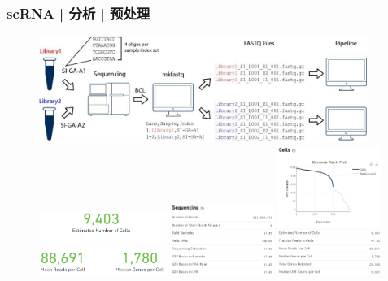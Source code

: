\documentclass[11pt]{ctexbeamer}
\begin{document}
\begin{frame}
  \frametitle{scRNA | 分析 | 预处理}
   \begin{figure}
    \centering
    \includegraphics[width=0.95\textwidth]{scRNA_cellranger_01.png}\\ \vspace{0.3em}
    \includegraphics[width=0.37\textwidth]{scRNA_cellranger_02.png}
    \includegraphics[width=0.3\textwidth]{scRNA_cellranger_03.png}
    \includegraphics[width=0.3\textwidth]{scRNA_cellranger_04.png}
  \end{figure}
\end{frame}
\end{document}
